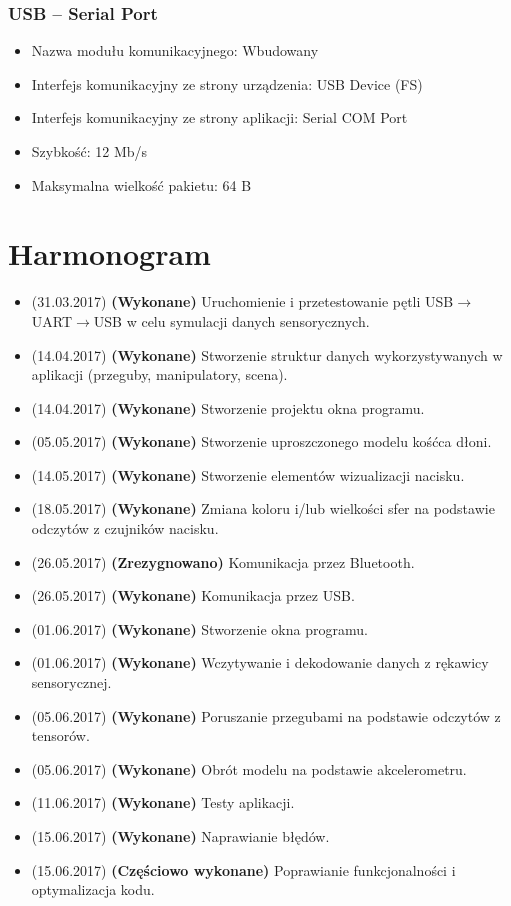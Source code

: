 \documentclass[10pt,a4paper]{article}
\begin{document}
\subsubsection{USB -- Serial Port}
\begin{itemize}
\item Nazwa modułu komunikacyjnego: Wbudowany
\item Interfejs komunikacyjny ze strony urządzenia: USB Device (FS)
\item Interfejs komunikacyjny ze strony aplikacji: Serial COM Port
\item Szybkość: 12 Mb/s
\item Maksymalna wielkość pakietu: 64 B
\end{itemize}

\newpage
\section{Harmonogram}
\begin{itemize}
\item (31.03.2017) \textbf{(Wykonane)} Uruchomienie i przetestowanie pętli USB$\rightarrow $UART$\rightarrow $USB w celu symulacji danych sensorycznych. 
\item (14.04.2017) \textbf{(Wykonane)} Stworzenie struktur danych wykorzystywanych w aplikacji (przeguby, manipulatory, scena).
\item (14.04.2017) \textbf{(Wykonane)} Stworzenie projektu okna programu.
\item (05.05.2017) \textbf{(Wykonane)} Stworzenie uproszczonego modelu kośćca dłoni.
\item (14.05.2017) \textbf{(Wykonane)} Stworzenie elementów wizualizacji nacisku.
\item (18.05.2017) \textbf{(Wykonane)} Zmiana koloru i/lub wielkości sfer na podstawie odczytów z czujników nacisku.
\item (26.05.2017) \textbf{(Zrezygnowano)} Komunikacja przez Bluetooth.
\item (26.05.2017) \textbf{(Wykonane)} Komunikacja przez USB.
\item (01.06.2017) \textbf{(Wykonane)} Stworzenie okna programu.
\item (01.06.2017) \textbf{(Wykonane)} Wczytywanie i dekodowanie danych z rękawicy sensorycznej.
\item (05.06.2017) \textbf{(Wykonane)} Poruszanie przegubami na podstawie odczytów z tensorów.
\item (05.06.2017) \textbf{(Wykonane)} Obrót modelu na podstawie akcelerometru.
\item (11.06.2017) \textbf{(Wykonane)} Testy aplikacji.
\item (15.06.2017) \textbf{(Wykonane)} Naprawianie błędów.
\item (15.06.2017) \textbf{(Częściowo wykonane)} Poprawianie funkcjonalności i optymalizacja kodu.
\end{itemize}
\end{document}
